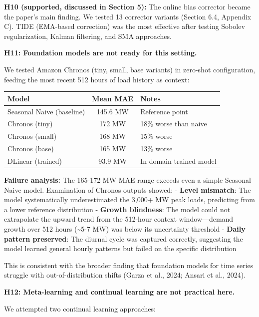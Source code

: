 \textbf{H10 (supported, discussed in Section 5):} The online bias
corrector became the paper's main finding. We tested 13 corrector
variants (Section 6.4, Appendix C). TIDE (EMA-based correction) was the
most effective after testing Sobolev regularization, Kalman filtering,
and SMA approaches.

\textbf{H11: Foundation models are not ready for this setting.}

We tested Amazon Chronos (tiny, small, base variants) in zero-shot
configuration, feeding the most recent 512 hours of load history as
context:

{\def\LTcaptype{none} %
\begin{longtable}[]{@{}lcl@{}}
\toprule\noalign{}
Model & Mean MAE & Notes \\
\midrule\noalign{}
\endhead
\bottomrule\noalign{}
\endlastfoot
Seasonal Naive (baseline) & 145.6 MW & Reference point \\
Chronos (tiny) & 172 MW & 18\% worse than naive \\
Chronos (small) & 168 MW & 15\% worse \\
Chronos (base) & 165 MW & 13\% worse \\
DLinear (trained) & 93.9 MW & In-domain trained model \\
\end{longtable}
}

\textbf{Failure analysis:} The 165-172 MW MAE range exceeds even a
simple Seasonal Naive model. Examination of Chronos outputs showed: -
\textbf{Level mismatch}: The model systematically underestimated the
3,000+ MW peak loads, predicting from a lower reference distribution -
\textbf{Growth blindness}: The model could not extrapolate the upward
trend from the 512-hour context window---demand growth over 512 hours
(\textasciitilde5-7 MW) was below its uncertainty threshold -
\textbf{Daily pattern preserved}: The diurnal cycle was captured
correctly, suggesting the model learned general hourly patterns but
failed on the specific distribution

This is consistent with the broader finding that foundation models for
time series struggle with out-of-distribution shifts (Garza et al.,
2024; Ansari et al., 2024).

\textbf{H12: Meta-learning and continual learning are not practical
here.}

We attempted two continual learning approaches:

